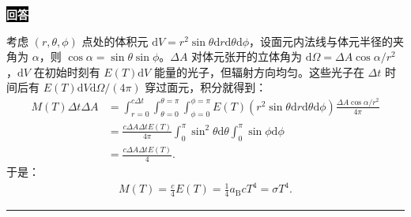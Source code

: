 \documentclass[11pt,a4paper]{ctexart}
\newenvironment{answer}
  {\par\smallskip\noindent
   \begingroup
   \setlength{\fboxsep}{4pt}%
   \colorbox{black}{\textcolor{white}{\bfseries 回答}}%
   \endgroup
   \quad\ignorespaces}
  {\par\smallskip\noindent\rule{\linewidth}{0.4pt}\medskip}
\begin{document}
\begin{answer}
\begin{enumerate}[label=(1.1.\arabic*),ref=1.1.\arabic*,leftmargin=4.5em]
    考虑 $(r,\theta,\phi) $ 点处的体积元 $\mathrm{d}V= r^2\sin\theta\mathrm{d}r\mathrm{d}\theta\mathrm{d}\phi $，设面元内法线与体元半径的夹角为 $\alpha $，则 $\cos\alpha=\sin\theta\sin\phi $。$\Delta A$ 对体元张开的立体角为 $\mathrm{d}\Omega=\Delta A\cos\alpha/r^2 $，$\mathrm{d}V $ 在初始时刻有 $E(T)\mathrm{d}V $ 能量的光子，但辐射方向均匀。这些光子在 $\Delta t $ 时间后有 $E(T)\mathrm{d}V \mathrm{d}\Omega/(4\pi)  $ 穿过面元，积分就得到：
    \begin{equation}
      \begin{aligned}
        M(T) \Delta t \Delta A
        &=\int_{r=0}^{c\Delta t} \int_{\theta=0}^{\theta=\pi} \int_{\phi=0}^{\phi=\pi} E(T) \left(r^2\sin\theta\mathrm{d}r\mathrm{d}\theta\mathrm{d}\phi \right) \frac{ \Delta A \cos\alpha/r^2 }{4\pi } \\
        &=\frac{c\Delta A \Delta t E(T)}{4\pi } \int_{0}^{\pi} \sin^2\theta \mathrm{d}\theta \int_{0}^{\pi}\sin\phi \mathrm{d}\phi \\
        &=\frac{c\Delta A\Delta t E(T)}{4 }.
      \end{aligned}
    \end{equation}
    于是：
    \begin{equation}
      \begin{aligned}
        M(T)
        =\frac{c }{4  } E(T)
        =\frac{1 }{4 } a_{\mathrm{B}} c T^4 
        =\sigma T^4.
      \end{aligned}
    \end{equation}
  \end{enumerate}
\end{answer}
\clearpage
\end{document}
